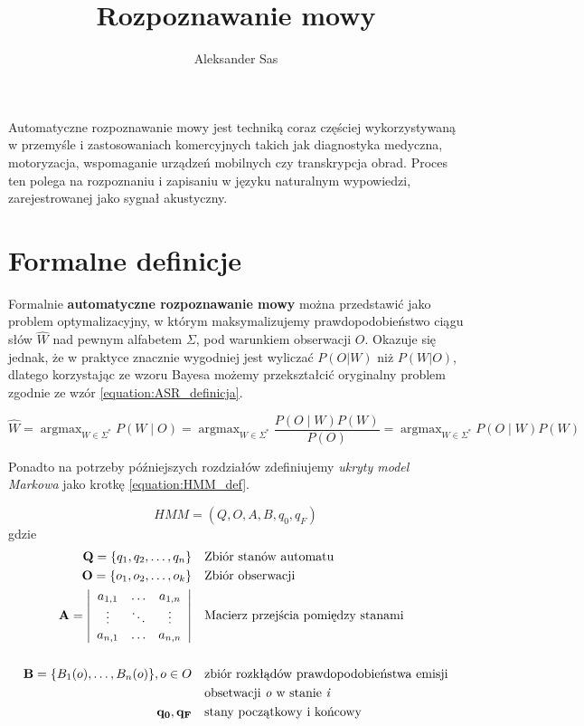 \documentclass[a4paper,11pt,onecolumn,twoside,openright,titlepage]{article}
\author{Aleksander Sas}
\title{Rozpoznawanie mowy}
\DeclareMathOperator*{\argmax}{\arg\max}   %
\begin{document}
	
	\maketitle
	\newpage
	
	Automatyczne rozpoznawanie mowy jest techniką coraz częściej wykorzystywaną w przemyśle i zastosowaniach komercyjnych takich jak diagnostyka medyczna, motoryzacja, wspomaganie urządzeń mobilnych czy transkrypcja obrad. Proces ten polega na rozpoznaniu i zapisaniu w języku naturalnym wypowiedzi, zarejestrowanej jako sygnał akustyczny.
	
	\section{Formalne definicje}
	Formalnie \textbf{automatyczne rozpoznawanie mowy} można przedstawić jako problem optymalizacyjny, w którym maksymalizujemy prawdopodobieństwo ciągu słów $\hat{W}$ nad pewnym alfabetem $\Sigma$, pod warunkiem obserwacji $O$. Okazuje się jednak, że w praktyce znacznie wygodniej jest wyliczać $P(O|W)$ niż $P(W|O)$, dlatego korzystając ze wzoru Bayesa możemy przekształcić oryginalny problem zgodnie ze wzór \ref{equation:ASR_definicja}.
	
	\begin{equation}
	\hat{W}=\argmax_{W \in \Sigma^{*}}{P(W \mid O)} = \argmax_{W \in \Sigma^{*}}{\frac{P(O \mid W)P(W)}{P(O)}} = \argmax_{W \in \Sigma^{*}}{P(O \mid W)P(W)}
	\label{equation:ASR_definicja}
	\end{equation}
	
	Ponadto na potrzeby późniejszych rozdziałów zdefiniujemy \textit{ukryty model Markowa} jako krotkę \ref{equation:HMM_def}.
	
	\begin{equation}
		HMM = (Q, O, A, B, q_0, q_F)
		\label{equation:HMM_def}
	\end{equation}
	gdzie
	\begin{align*}
		\mathbf{Q}=\{q_1, q_2,\ldots,q_n\} & &&  \text{Zbiór stanów automatu} \\
		\mathbf{O}=\{o_1, o_2,\ldots,o_k\} & &&  \text{Zbiór obserwacji} \\
		\mathbf{A} =
		\left| \begin{array}{ccc}
		a_{1,1} & \ldots & a_{1,n} \\
		\vdots  & \ddots & \vdots\\
		a_{n,1} & \ldots & a_{n,n}
		\end{array} \right|
		& &&  \text{Macierz przejścia pomiędzy stanami} \\
		& && \\
		\mathbf{B}=\{B_1(o),\ldots,B_n(o)\},o \in O & && \text{zbiór rozkłądów prawdopodobieństwa emisji} \\ 
		& && \text{obsetwacji \textit{o} w stanie \textit{i}} \\
		\mathbf{q_0, q_F}				  & && \text{stany początkowy i końcowy}
	\end{align*}
\end{document}
